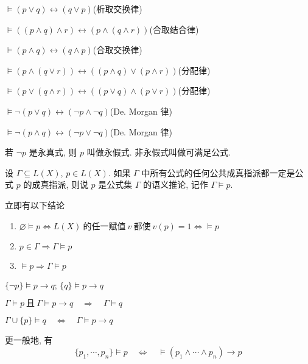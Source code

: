 \documentclass[
    color=black,
    device=normal,
    lang=cn
]{elegantnote}
\begin{document}
$\vDash (p\lor q)\leftrightarrow(q\lor p)$\hfill(析取交换律)

$\vDash ((p\land q)\land r)\leftrightarrow(p\land(q\land r))$\hfill(合取结合律)

$\vDash (p\land q)\leftrightarrow(q\land p)$\hfill(合取交换律)

$\vDash (p\land(q\lor r))\leftrightarrow((p\land q)\lor(p\land r))$\hfill(分配律)

$\vDash (p\lor (q\land r))\leftrightarrow((p\lor q)\land (p\lor r))$\hfill(分配律)

$\vDash \lnot(p\lor q)\leftrightarrow(\lnot p\land\lnot q)$\hfill(De. Morgan 律)

$\vDash \lnot(p\land q)\leftrightarrow(\lnot p\lor\lnot q)$\hfill(De. Morgan 律)

\begin{definition}[永假式与可满足公式]
    若 $\lnot p$ 是永真式, 则 $p$ 叫做永假式. 非永假式叫做可满足公式.
\end{definition}
\begin{definition}[语义推论]
    设 $\Gamma \subseteq L(X)$, $p\in L(X)$. 如果 $\Gamma$ 中所有公式的任何公共成真指派都一定是公式 $p$ 的成真指派, 则说 $p$ 是公式集 $\Gamma$ 的语义推论, 记作 $\Gamma\vDash p$.
\end{definition}
立即有以下结论
\begin{enumerate}[label = $\arabic*^\circ$, topsep = -1em]
    \item $\varnothing\vDash p\Leftrightarrow L(X)\ \text{的任一赋值}\ v\ \text{都使}\ v(p)=1\Leftrightarrow\vDash p$
    \item $p\in\Gamma\Rightarrow\Gamma\vDash p$
    \item $\vDash p\Rightarrow\Gamma\vDash p$
\end{enumerate}
\begin{proposition}
    $\{\lnot p\}\vDash p\to q$; $\{q\}\vDash p\to q$
\end{proposition}
\begin{proposition}
    $\Gamma\vDash p\ \text{且}\ \Gamma\vDash p\to q\quad\Rightarrow\quad\Gamma\vDash q$
\end{proposition}
\begin{proposition}[语义演绎定理]
    $\Gamma\cup\{p\}\vDash q\quad\Leftrightarrow\quad\Gamma\vDash p\to q$
\end{proposition}
更一般地, 有
$$
    \{p_1,\cdots,p_n\}\vDash p\quad\Leftrightarrow\quad \vDash(p_1\land\cdots\land p_n)\to p
$$
\end{document}
